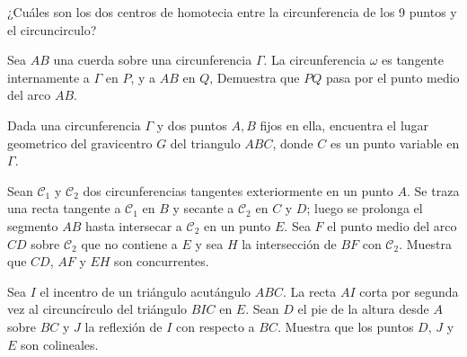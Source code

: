 \documentclass[11pt]{scrartcl}
\begin{document}
\begin{problem}
    ¿Cuáles son los dos centros de homotecia entre la circunferencia de los 9 puntos y el circuncirculo?
\end{problem}

\begin{problem}
Sea $AB$ una cuerda sobre una circunferencia $\Gamma$. La circunferencia $\omega$ es tangente internamente a $\Gamma$ en $P$, y a $AB$ en $Q$, Demuestra que $PQ$ pasa por el punto medio del arco $AB$.   
\end{problem}

\begin{problem}
Dada una circunferencia $\Gamma$ y dos puntos $A,B$ fijos en ella, encuentra el lugar geometrico del gravicentro $G$ del triangulo $ABC$, donde $C$ es un punto variable en $\Gamma$.
\end{problem}



\begin{problem} %
    
    Sean $\mathcal{C}_1$ y $\mathcal{C}_2$ dos circunferencias tangentes exteriormente en un punto $A$. Se traza una recta tangente a $\mathcal{C}_1$ en $B$ y secante a $\mathcal{C}_2$ en $C$ y $D$; luego se prolonga el segmento $AB$ hasta intersecar a $\mathcal{C}_2$ en un punto $E$. Sea $F$ el punto medio del arco $CD$ sobre $\mathcal{C}_2$ que no contiene a $E$ y sea $H$ la intersección de $BF$ con $\mathcal{C}_2$. Muestra que $CD$, $AF$ y $EH$ son concurrentes.
    
\end{problem}


\begin{problem} %
    
    Sea $I$ el incentro de un triángulo acutángulo $ABC$. La recta $AI$ corta por segunda vez al
circuncírculo del triángulo $BIC$ en $E$. Sean $D$ el pie de la altura desde $A$ sobre $BC$ y $J$
la reflexión de $I$ con respecto a $BC$. Muestra que los puntos $D$, $J$ y $E$ son colineales.
    
\end{problem}
\end{document}
